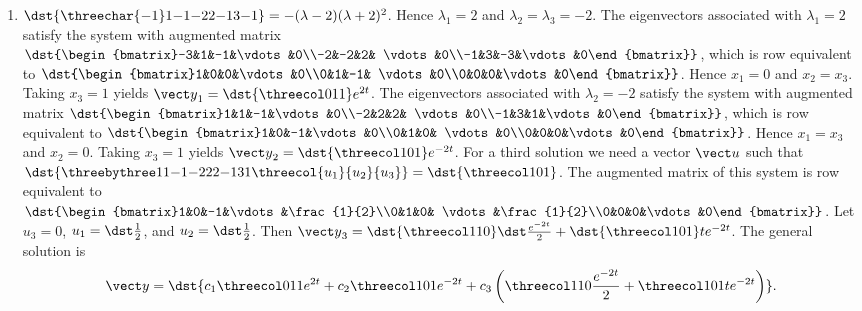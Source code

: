\documentclass[openany]{book}
\newenvironment{sectionSolutions}{
 \begin{enumerate}[item-label={\thesection.\arabic{enumi}.}]
}{
 \end{enumerate}
}
\begin{document}
\begin{sectionSolutions}
\item
$\dst{\threechar{-1}1{-1}{-2}{}2{-1}3{-1}}
=-(\lambda-2)(\lambda+2)^2$.
Hence $\lambda_1=2$ and  $\lambda_2=\lambda_3=-2$.
The eigenvectors associated
 with $\lambda_1=2$ satisfy the system with  augmented matrix
$\dst{\begin{bmatrix}-3&1&-1&\vdots&0\\-2&-2&2&
\vdots&0\\-1&3&-3&\vdots&0\end{bmatrix}}$,
which is row equivalent to
$\dst{\begin{bmatrix}1&0&0&\vdots&0\\0&1&-1&
\vdots&0\\0&0&0&\vdots&0\end{bmatrix}}$.
Hence  $x_1=0$ and $x_2=x_3$.  Taking $x_3=1$
yields
${\vect y}_1=\dst{\threecol011}e^{2t}$.
The eigenvectors associated
 with $\lambda_2=-2$ satisfy the system with  augmented matrix
$\dst{\begin{bmatrix}1&1&-1&\vdots&0\\-2&2&2&
\vdots&0\\-1&3&1&\vdots&0\end{bmatrix}}$,
which is row equivalent to
$\dst{\begin{bmatrix}1&0&-1&\vdots&0\\0&1&0&
\vdots&0\\0&0&0&\vdots&0\end{bmatrix}}$.
Hence  $x_1=x_3$ and $x_2=0$.  Taking $x_3=1$
yields
${\vect y}_2=\dst{\threecol101}e^{-2t}$.
For a third solution we need a vector ${\vect u}$ such that
$\dst{\threebythree11{-1}{-2}22{-1}31\threecol{u_1}{u_2}{u_3}}=\dst{\threecol101}$.
The augmented matrix of this system is row equivalent to
$\dst{\begin{bmatrix}1&0&-1&\vdots&\frac{1}{2}\\0&1&0&
\vdots&\frac{1}{2}\\0&0&0&\vdots&0\end{bmatrix}}$.
Let $u_3=0$, $u_1=\dst\frac{1}{2}$, and $u_2=\dst\frac{1}{2}$. Then ${\vect
y}_3=\dst{\threecol110}\dst\frac{e^{-2t}}{2}+\dst{\threecol101}te^{-2t}$.
The general solution is
\[
{\vect y}=\dst{
c_1\threecol011e^{2t}+c_2\threecol101e^{-2t}+c_3\left
(\threecol110\frac{e^{-2t}}{2}+\threecol101te^{-2t}\right)}.
\]



\end{sectionSolutions}
\end{document}
